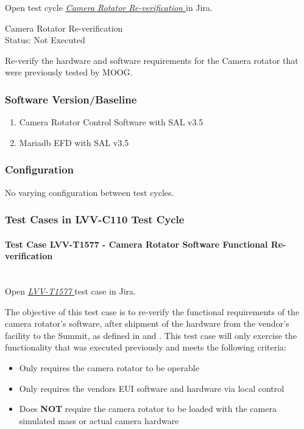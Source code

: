 \documentclass[SE,lsstdraft,STR,toc]{lsstdoc}
\providecommand{\tightlist}{
  \setlength{\itemsep}{0pt}\setlength{\parskip}{0pt}}
\begin{document}
Open test cycle {\it \href{https://jira.lsstcorp.org/secure/Tests.jspa#/testrun/LVV-C110}{Camera Rotator Re-verification
}} in Jira.

  Camera Rotator Re-verification
\\
  Status: Not Executed

  Re-verify the hardware and software requirements for the Camera rotator
that were previously tested by MOOG.


  \subsubsection{Software Version/Baseline}
    \begin{enumerate}
\tightlist
\item
  Camera Rotator Control Software with SAL v3.5
\item
  Mariadb EFD with SAL v3.5
\end{enumerate}


  \subsubsection{Configuration}
    No varying configuration between test cycles.


  \subsubsection{Test Cases in LVV-C110 Test Cycle}


    \paragraph{Test Case LVV-T1577 - Camera Rotator Software Functional Re-verification
 }\mbox{}\\

Open  \href{https://jira.lsstcorp.org/secure/Tests.jspa#/testCase/LVV-T1577}{\textit{ LVV-T1577 } }
test case in Jira.

    The objective of this test case is to re-verify the functional
requirements of the camera rotator's software, after shipment of the
hardware from the vendor's facility to the Summit, as defined in 
and . This test case will only exercise the functionality that
was executed previously and meets the following criteria:

\begin{itemize}
\tightlist
\item
  Only requires the camera rotator to be operable
\item
  Only requires the vendors EUI software and hardware via local control
\item
  Does \textbf{NOT} require the camera rotator to be loaded with the
  camera simulated mass or actual camera hardware
\end{itemize}
\end{document}
